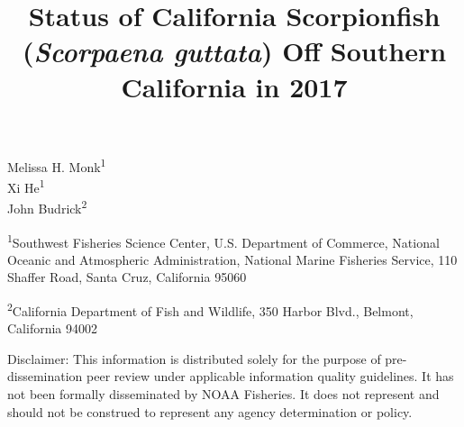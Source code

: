 \documentclass[12pt,]{article}
\title{Status of California Scorpionfish (\emph{Scorpaena guttata}) Off
Southern California in 2017}
\author{}
\date{}
\begin{document}
\maketitle


\begin{center}
\thispagestyle{empty}


\vspace{.5cm}




Melissa H. Monk\textsuperscript{1}\\
Xi He\textsuperscript{1}\\
John Budrick\textsuperscript{2}\\

\vspace{.5cm}

\small
\textsuperscript{1}Southwest Fisheries Science Center, U.S. Department of Commerce, National Oceanic and Atmospheric Administration, National Marine Fisheries Service, 110 Shaffer Road, Santa Cruz, California 95060\\

\vspace{.3cm}

\textsuperscript{2}California Department of Fish and Wildlife, 350 Harbor Blvd., Belmont, California 94002\\


\vspace{.5cm}

\vfill
Disclaimer: This information is distributed solely for the purpose of pre-dissemination
peer review under applicable information quality guidelines. It has not been formally
disseminated by NOAA Fisheries. It does not represent and should not be construed to
represent any agency determination or policy. 

\vspace{.3cm}



\end{center}
\end{document}
